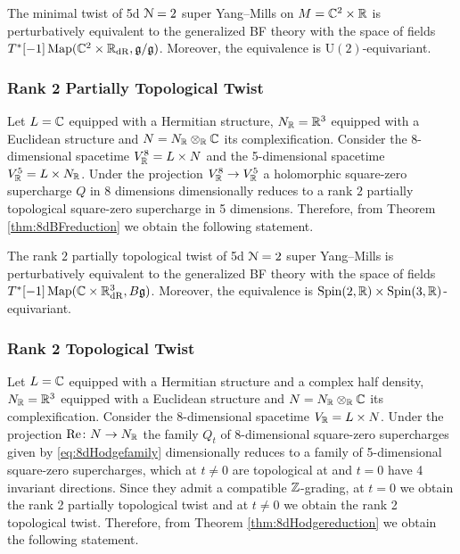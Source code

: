 \documentclass[10pt, oneside]{article}
\renewcommand{\Re}{\mathrm{Re}}
\renewcommand{\U}{\mathrm{U}}
\begin{document}
\begin{theorem}
The minimal twist of 5d $\mathcal N=2$ super Yang--Mills on $M=\mathbb C^2\times \mathbb R$ is perturbatively equivalent to the generalized BF theory with the space of fields $T^*[-1]\operatorname{Map}(\mathbb C^2\times \mathbb R_{\mathrm{dR}}, \mathfrak g/\mathfrak g)$. Moreover, the equivalence is $\U(2)$-equivariant.
\end{theorem}

\subsubsection{Rank 2 Partially Topological Twist}
\label{sect:5dpartialtwist}

Let $L = \mathbb C$ equipped with a Hermitian structure, $N_\mathbb R=\mathbb R^3$ equipped with a Euclidean structure and $N=N_\mathbb R\otimes_\mathbb R\mathbb C$ its complexification. Consider the 8-dimensional spacetime $V^8_\mathbb R=L\times N$ and the 5-dimensional spacetime $V^5_\mathbb R=L\times N_\mathbb R$. Under the projection $V^8_\mathbb R\rightarrow V^5_\mathbb R$ a holomorphic square-zero supercharge $Q$ in 8 dimensions dimensionally reduces to a rank $2$ partially topological square-zero supercharge in 5 dimensions. Therefore, from Theorem \ref{thm:8dBFreduction} we obtain the following statement.

\begin{theorem}
The rank $2$ partially topological twist of 5d $\mathcal N=2$ super Yang--Mills is perturbatively equivalent to the generalized BF theory with the space of fields $T^*[-1]\operatorname{Map}(\mathbb C\times \mathbb R^3_{\mathrm{dR}}, B\mathfrak g)$. Moreover, the equivalence is $\mathrm{Spin}(2, \mathbb R)\times\mathrm{Spin}(3, \mathbb R)$-equivariant.
\end{theorem}

\subsubsection{Rank 2 Topological Twist}
\label{sect:5drank2topologicaltwist}

Let $L=\mathbb C$ equipped with a Hermitian structure and a complex half density, $N_\mathbb R=\mathbb R^3$ equipped with a Euclidean structure and $N=N_\mathbb R\otimes_\mathbb R\mathbb C$ its complexification. Consider the 8-dimensional spacetime $V_\mathbb R=L\times N$. Under the projection $\Re\colon N\rightarrow N_\RR$ the family $Q_t$ of 8-dimensional square-zero supercharges given by \eqref{eq:8dHodgefamily} dimensionally reduces to a family of 5-dimensional square-zero supercharges, which at $t\neq 0$ are topological at and $t=0$ have 4 invariant directions. Since they admit a compatible $\mathbb Z$-grading, at $t=0$ we obtain the rank 2 partially topological twist and at $t\neq 0$ we obtain the rank 2 topological twist. Therefore, from Theorem \ref{thm:8dHodgereduction} we obtain the following statement.
\end{document}
